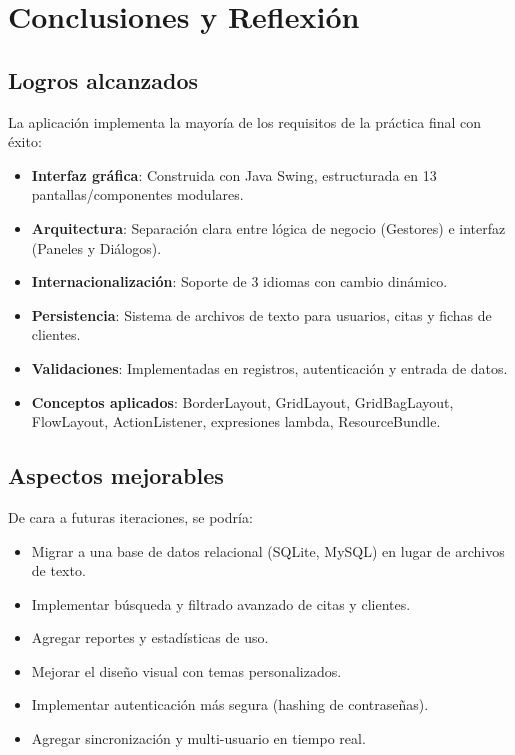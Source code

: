 \documentclass[12pt,a4paper]{report}
\begin{document}
\chapter{Conclusiones y Reflexión}

\section{Logros alcanzados}
La aplicación implementa la mayoría de los requisitos de la práctica final con éxito:
\begin{itemize}
    \item \textbf{Interfaz gráfica}: Construida con Java Swing, estructurada en 13 pantallas/componentes modulares.
    \item \textbf{Arquitectura}: Separación clara entre lógica de negocio (Gestores) e interfaz (Paneles y Diálogos).
    \item \textbf{Internacionalización}: Soporte de 3 idiomas con cambio dinámico.
    \item \textbf{Persistencia}: Sistema de archivos de texto para usuarios, citas y fichas de clientes.
    \item \textbf{Validaciones}: Implementadas en registros, autenticación y entrada de datos.
    \item \textbf{Conceptos aplicados}: BorderLayout, GridLayout, GridBagLayout, FlowLayout, ActionListener, expresiones lambda, ResourceBundle.
\end{itemize}

\section{Aspectos mejorables}
De cara a futuras iteraciones, se podría:
\begin{itemize}
    \item Migrar a una base de datos relacional (SQLite, MySQL) en lugar de archivos de texto.
    \item Implementar búsqueda y filtrado avanzado de citas y clientes.
    \item Agregar reportes y estadísticas de uso.
    \item Mejorar el diseño visual con temas personalizados.
    \item Implementar autenticación más segura (hashing de contraseñas).
    \item Agregar sincronización y multi-usuario en tiempo real.
\end{itemize}
\end{document}
